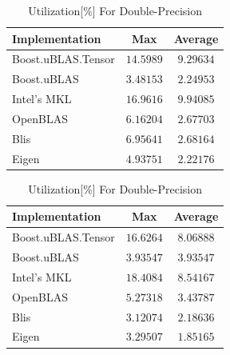 \begin{table}[ht]
    \centering
    \caption{Utilization[\%] For Single-Precision}
    \begin{tabular}{|l|c|c|}
        \hline
        \textbf{Implementation} & \textbf{Max} & \textbf{Average}\\
        \hline
        Boost.uBLAS.Tensor  & $14.5989$ & $9.29634$ \\
        \hline
        Boost.uBLAS         & $3.48153$ & $2.24953$ \\
        \hline
        Intel's MKL         & $16.9616$ & $9.94085$ \\
        \hline
        OpenBLAS            & $6.16204$ & $2.67703$ \\
        \hline
        Blis                & $6.95641$ & $2.68164$ \\
        \hline
        Eigen               & $4.93751$ & $2.22176$ \\
        \hline
    \end{tabular}

    \vspace*{1 cm}

    \centering
    \caption{Utilization[\%] For Double-Precision}
    \begin{tabular}{|l|c|c|}
        \hline
        \textbf{Implementation} & \textbf{Max} & \textbf{Average}\\
        \hline
        Boost.uBLAS.Tensor  & $16.6264$ & $8.06888$ \\
        \hline
        Boost.uBLAS         & $3.93547$ & $3.93547$ \\
        \hline
        Intel's MKL         & $18.4084$ & $8.54167$ \\
        \hline
        OpenBLAS            & $5.27318$ & $3.43787$ \\
        \hline
        Blis                & $3.12074$ & $2.18636$ \\
        \hline
        Eigen               & $3.29507$ & $1.85165$ \\
        \hline
    \end{tabular}
\end{table}

